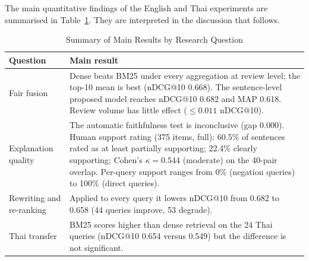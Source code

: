 The main quantitative findings of the English and Thai experiments are summarised in Table~\ref{tab:ressummary}. They are interpreted in the discussion that follows.

\begin{table}[htbp]
\centering
\caption{Summary of Main Results by Research Question}
\label{tab:ressummary}
\small
\begin{tabular}{|p{}|p{}|}
\hline
\textbf{Question} & \textbf{Main result} \\
\hline
Fair fusion & Dense beats BM25 under every aggregation at review level; the top-10 mean is best (nDCG@10 0.668). The sentence-level proposed model reaches nDCG@10 0.682 and MAP 0.618. Review volume has little effect ($\le 0.011$ nDCG@10). \\
\hline
Explanation quality & The automatic faithfulness test is inconclusive (gap 0.000). Human support rating (375 items, full): 60.5\% of sentences rated as at least partially supporting; 22.4\% clearly supporting; Cohen's $\kappa = 0.544$ (moderate) on the 40-pair overlap. Per-query support ranges from 0\% (negation queries) to 100\% (direct queries). \\
\hline
Rewriting and re-ranking & Applied to every query it lowers nDCG@10 from 0.682 to 0.658 (44 queries improve, 53 degrade). \\
\hline
Thai transfer & BM25 scores higher than dense retrieval on the 24 Thai queries (nDCG@10 0.654 versus 0.549) but the difference is not significant. \\
\hline
\end{tabular}
\end{table}
